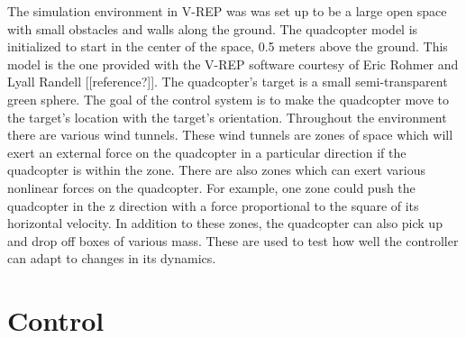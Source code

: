 \documentclass[letterpaper,12pt,titlepage,oneside,final]{book}
\begin{document}

The simulation environment in V-REP was was set up to be a large open space with small obstacles and walls along the ground. 
The quadcopter model is initialized to start in the center of the space, 0.5 meters above the ground. 
This model is the one provided with the V-REP software courtesy of Eric Rohmer and Lyall Randell [[reference?]]. 
The quadcopter’s target is a small semi-transparent green sphere. The goal of the control system is to make the quadcopter move to the target’s location with the target’s orientation. 
Throughout the environment there are various wind tunnels. 
These wind tunnels are zones of space which will exert an external force on the quadcopter in a particular direction if the quadcopter is within the zone. 
There are also zones which can exert various nonlinear forces on the quadcopter. 
For example, one zone could push the quadcopter in the z direction with a force proportional to the square of its horizontal velocity. 
In addition to these zones, the quadcopter can also pick up and drop off boxes of various mass. 
These are used to test how well the controller can adapt to changes in its dynamics.

\section{Control}

\end{document}
